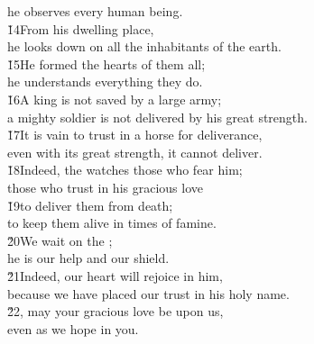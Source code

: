\begin{poetry}
\poemll    he observes every human being. \\
\poeml \v{14}From his dwelling place, \\
\poemll    he looks down on all the inhabitants of the earth. \\
\poeml \v{15}He formed the hearts of them all; \\
\poemll    he understands everything they do. \\
\poeml \v{16}A king is not saved by a large army; \\
\poemll    a mighty soldier is not delivered by his great strength. \\
\poeml \v{17}It is vain to trust in a horse for deliverance, \\
\poemll    even with its great strength, it cannot deliver. \\
\poeml \v{18}Indeed, the  watches those who fear him; \\
\poemll    those who trust in his gracious love \\
\poeml \v{19}to deliver them from death; \\
\poemll    to keep them alive in times of famine. \\
\poeml \v{20}We wait on the ; \\
\poemll    he is our help and our shield. \\
\poeml \v{21}Indeed, our heart will rejoice in him, \\
\poemll    because we have placed our trust in his holy name. \\
\poeml \v{22}, may your gracious love be upon us, \\
\poemll    even as we hope in you.
\end{poetry}

